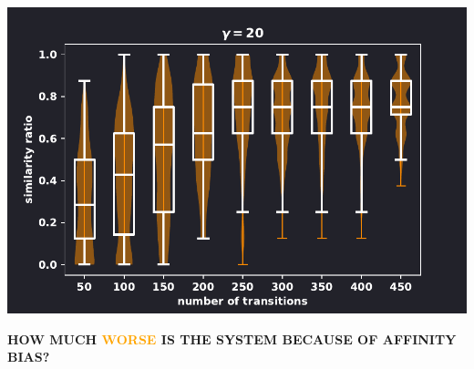 \documentclass{beamer}
\begin{document}
\begin{frame}
    \centering
        
\end{frame}

\begin{frame}[fragile]
    \begin{center}
    \includegraphics[width=.7\textwidth]{static/high_similarity_ratio.pdf}
    \end{center}
\end{frame}

\begin{frame}[fragile]
    \begin{minipage}{.49\textwidth}
    
    \end{minipage}
    \begin{minipage}{.49\textwidth}
        \vspace{-.1cm} 
    \end{minipage}
\end{frame}

\begin{frame}[fragile]
    \centering
        \vspace{-1cm}
        
\end{frame}

\begin{frame}
    \begin{center}
    \Large \textbf{HOW MUCH \textcolor{orange}{WORSE} IS THE SYSTEM BECAUSE OF AFFINITY BIAS?}
    \end{center}
\end{frame}
\end{document}
